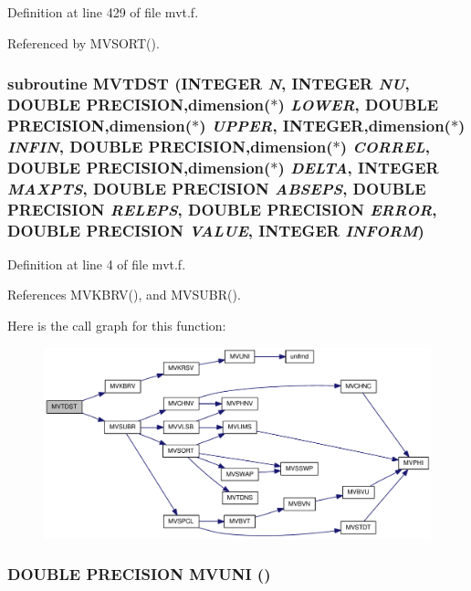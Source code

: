 Definition at line 429 of file mvt.f.

Referenced by MVSORT().\hypertarget{mvt_8f_4b51e2fd2b5378c70a36771ac4cfed04}{
\subsubsection[{MVTDST}]{\setlength{\rightskip}{0pt plus 5cm}subroutine MVTDST (INTEGER {\em N}, \/  INTEGER {\em NU}, \/  DOUBLE PRECISION,dimension($\ast$) {\em LOWER}, \/  DOUBLE PRECISION,dimension($\ast$) {\em UPPER}, \/  INTEGER,dimension($\ast$) {\em INFIN}, \/  DOUBLE PRECISION,dimension($\ast$) {\em CORREL}, \/  DOUBLE PRECISION,dimension($\ast$) {\em DELTA}, \/  INTEGER {\em MAXPTS}, \/  DOUBLE PRECISION {\em ABSEPS}, \/  DOUBLE PRECISION {\em RELEPS}, \/  DOUBLE PRECISION {\em ERROR}, \/  DOUBLE PRECISION {\em VALUE}, \/  INTEGER {\em INFORM})}}
\label{mvt_8f_4b51e2fd2b5378c70a36771ac4cfed04}




Definition at line 4 of file mvt.f.

References MVKBRV(), and MVSUBR().

Here is the call graph for this function:\nopagebreak
\begin{figure}[H]
\begin{center}
\leavevmode
\includegraphics[width=330pt]{mvt_8f_4b51e2fd2b5378c70a36771ac4cfed04_cgraph}
\end{center}
\end{figure}
\hypertarget{mvt_8f_1ab822a6524a9096bf2ec00253f890e3}{
\subsubsection[{MVUNI}]{\setlength{\rightskip}{0pt plus 5cm}DOUBLE PRECISION MVUNI ()}}
\label{mvt_8f_1ab822a6524a9096bf2ec00253f890e3}




